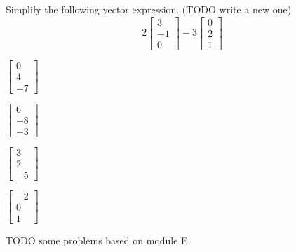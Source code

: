 \documentclass{article}
\begin{document}
\begin{readinessAssuranceTest}

\item Simplify the following vector expression. (TODO write a new one)
  \[
  2
  \begin{bmatrix}
    3 \\ -1 \\ 0
  \end{bmatrix}-
  3
  \begin{bmatrix}
    0 \\ 2 \\ 1
  \end{bmatrix}
  \]

\begin{multicols}{4}
\begin{readinessAssuranceTestChoices}
\item \(
        \begin{bmatrix}
          0 \\ 4 \\ -7
        \end{bmatrix}
      \)
\item \(
        \begin{bmatrix}
          6 \\ -8 \\ -3
        \end{bmatrix}
      \)
\item \(
        \begin{bmatrix}
          3 \\ 2 \\ -5
        \end{bmatrix}
      \)
\item \(
        \begin{bmatrix}
          -2 \\ 0 \\ 1
        \end{bmatrix}
      \)
\end{readinessAssuranceTestChoices}
\end{multicols}

\item TODO some problems based on module E.



\end{readinessAssuranceTest}
\end{document}
